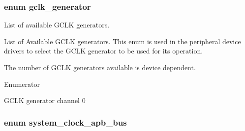 \subsubsection[{gclk\+\_\+generator}]{\setlength{\rightskip}{0pt plus 5cm}enum {\bf gclk\+\_\+generator}}\label{group__asfdoc__sam0__system__clock__group_ga1ab9bb87560ad127ed982591b7d67311}


List of available G\+C\+L\+K generators. 

List of Available G\+C\+L\+K generators. This enum is used in the peripheral device drivers to select the G\+C\+L\+K generator to be used for its operation.

The number of G\+C\+L\+K generators available is device dependent. \begin{Desc}
\item[Enumerator]\par
\begin{description}
\item[{\em 
\hypertarget{group__asfdoc__sam0__system__clock__group_gga1ab9bb87560ad127ed982591b7d67311a66f60c7b34b5fc16a9845d83370f7231}{}G\+C\+L\+K\+\_\+\+G\+E\+N\+E\+R\+A\+T\+O\+R\+\_\+0\label{group__asfdoc__sam0__system__clock__group_gga1ab9bb87560ad127ed982591b7d67311a66f60c7b34b5fc16a9845d83370f7231}
}]G\+C\+L\+K generator channel 0 \end{description}
\end{Desc}
\hypertarget{group__asfdoc__sam0__system__clock__group_gac4ca1e52df2ab46c663dc51b51f9f2d5}{}
\subsubsection[{system\+\_\+clock\+\_\+apb\+\_\+bus}]{\setlength{\rightskip}{0pt plus 5cm}enum {\bf system\+\_\+clock\+\_\+apb\+\_\+bus}}\label{group__asfdoc__sam0__system__clock__group_gac4ca1e52df2ab46c663dc51b51f9f2d5}


